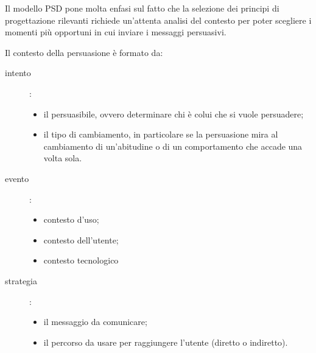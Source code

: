 Il modello PSD pone molta enfasi sul fatto che la selezione dei principi di progettazione rilevanti richiede un'attenta analisi del contesto per poter scegliere i momenti più opportuni in cui inviare i messaggi persuasivi.

Il contesto della persuasione è formato da:
\begin{description}
    \item[intento]:
    \begin{itemize}
        \item il persuasibile, ovvero determinare chi è colui che si vuole persuadere;
        \item il tipo di cambiamento, in particolare se la persuasione mira al cambiamento di un'abitudine o di un comportamento che accade una volta sola.
    \end{itemize}
    \item[evento]:
    \begin{itemize}
        \item contesto d'uso;
        \item contesto dell'utente;
        \item contesto tecnologico
    \end{itemize}
    \item[strategia]:
    \begin{itemize}
        \item il messaggio da comunicare;
        \item il percorso da usare per raggiungere l'utente (diretto o indiretto).
    \end{itemize} 
\end{description}

